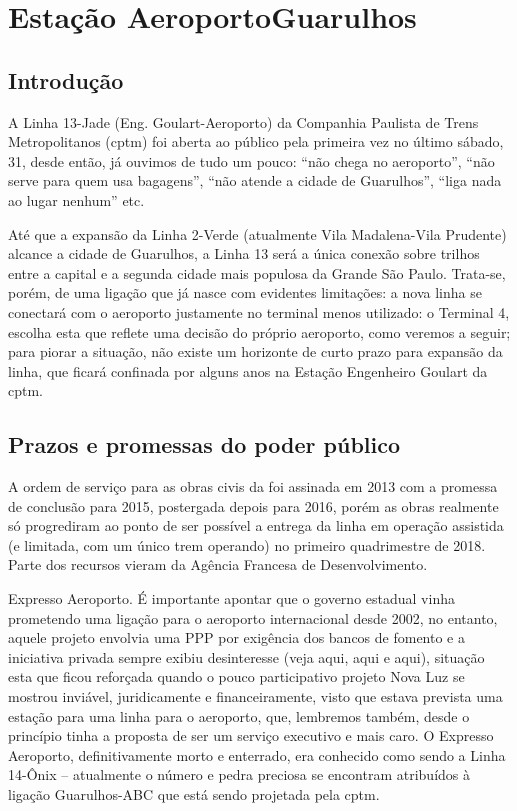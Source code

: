 \documentclass[11pt,fleqn]{book} %
\begin{document}
\section{Estação Aeroporto\textperiodcentered Guarulhos}\label{s:agu}

\subsection{Introdução}

A Linha 13-Jade (Eng. Goulart-Aeroporto) da Companhia Paulista de Trens Metropolitanos (\gls{cptm}) foi aberta ao público pela primeira vez no último sábado, 31, desde então, já ouvimos de tudo um pouco: “não chega no aeroporto”, “não serve para quem usa bagagens”, “não atende a cidade de Guarulhos”, “liga nada ao lugar nenhum” etc.

Até que a expansão da Linha 2-Verde (atualmente Vila Madalena-Vila Prudente) alcance a cidade de Guarulhos, a Linha 13 será a única conexão sobre trilhos entre a capital e a segunda cidade mais populosa da Grande São Paulo. Trata-se, porém, de uma ligação que já nasce com evidentes limitações: a nova linha se conectará com o aeroporto justamente no terminal menos utilizado: o Terminal 4, escolha esta que reflete uma decisão do próprio aeroporto, como veremos a seguir; para piorar a situação, não existe um horizonte de curto prazo para expansão da linha, que ficará confinada por alguns anos na Estação Engenheiro Goulart da \gls{cptm}.

\subsection{Prazos e promessas do poder público}

A ordem de serviço para as obras civis da foi assinada em 2013 com a promessa de conclusão para 2015, postergada depois para 2016, porém as obras realmente só progrediram ao ponto de ser possível a entrega da linha em operação assistida (e limitada, com um único trem operando) no primeiro quadrimestre de 2018. Parte dos recursos vieram da Agência Francesa de Desenvolvimento.

Expresso Aeroporto. É importante apontar que o governo estadual vinha prometendo uma ligação para o aeroporto internacional desde 2002, no entanto, aquele projeto envolvia uma PPP por exigência dos bancos de fomento e a iniciativa privada sempre exibiu desinteresse (veja aqui, aqui e aqui), situação esta que ficou reforçada quando o pouco participativo projeto Nova Luz se mostrou inviável, juridicamente e financeiramente, visto que estava prevista uma estação para uma linha para o aeroporto, que, lembremos também, desde o princípio tinha a proposta de ser um serviço executivo e mais caro. O Expresso Aeroporto, definitivamente morto e enterrado, era conhecido como sendo a Linha 14-Ônix – atualmente o número e pedra preciosa se encontram atribuídos à ligação Guarulhos-ABC que está sendo projetada pela \gls{cptm}.
\end{document}
